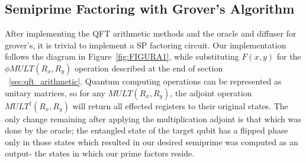 \documentclass[twocolumn]{cinc}
\begin{document}


  \subsection{Semiprime Factoring with Grover's Algorithm}

  After implementing the QFT arithmetic methods and the oracle and diffuser for
  grover's, it is trivial to implement a SP factoring circuit. Our implementation
  follows the diagram in Figure~\ref{fig:FIGURA1}, while substituting $F(x,y)$ for
  the $\phi MULT(R_x, R_y)$ operation described at the end of section 
  \ \ref{sec:qft_arithmetic}. Quantum computing operations can be represented as unitary
  matrices, so for any $MULT(R_x, R_y)$, the adjoint operation $MULT^\dagger(R_x,R_y)$ will 
  return all effected registers to their original states. The only change remaining after
  applying the multiplication adjoint is that which was done by the oracle; the entangled state
  of the target qubit has a flipped phase only in those states which resulted in our desired
  semiprime was computed as an output- the states in which our prime factors reside.
\end{document}
